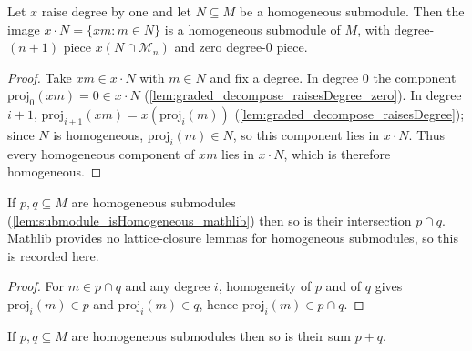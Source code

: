 \begin{lemma}\leanok
  \label{lem:graded_map_isHomogeneous}
  Let \(x\) raise degree by one and let \(N \subseteq M\) be a homogeneous submodule.
  Then the image \(x \cdot N = \{x m : m \in N\}\) is a homogeneous submodule of
  \(M\), with degree-\((n+1)\) piece \(x(N \cap \mathcal{M}_n)\) and zero
  degree-\(0\) piece.
\end{lemma}

\begin{proof}
    \leanok
  Take \(x m \in x \cdot N\) with \(m \in N\) and fix a degree. In degree \(0\) the
  component \(\mathrm{proj}_0(x m) = 0 \in x \cdot N\)
  (\cref{lem:graded_decompose_raisesDegree_zero}). In degree \(i+1\),
  \(\mathrm{proj}_{i+1}(x m) = x(\mathrm{proj}_i(m))\)
  (\cref{lem:graded_decompose_raisesDegree}); since \(N\) is homogeneous,
  \(\mathrm{proj}_i(m) \in N\), so this component lies in \(x \cdot N\). Thus every
  homogeneous component of \(x m\) lies in \(x \cdot N\), which is therefore
  homogeneous.
\end{proof}

\begin{lemma}\leanok
  \label{lem:graded_inf_isHomogeneous}
  If \(p, q \subseteq M\) are homogeneous submodules
  (\cref{lem:submodule_isHomogeneous_mathlib}) then so is their intersection \(p
  \cap q\). Mathlib provides no lattice-closure lemmas for homogeneous submodules, so
  this is recorded here.
\end{lemma}

\begin{proof}
  \leanok
  For \(m \in p \cap q\) and any degree \(i\), homogeneity of \(p\) and of \(q\)
  gives \(\mathrm{proj}_i(m) \in p\) and \(\mathrm{proj}_i(m) \in q\), hence
  \(\mathrm{proj}_i(m) \in p \cap q\).
\end{proof}

\begin{lemma}\leanok
  \label{lem:graded_sup_isHomogeneous}
  If \(p, q \subseteq M\) are homogeneous submodules then so is their sum \(p + q\).
\end{lemma}

